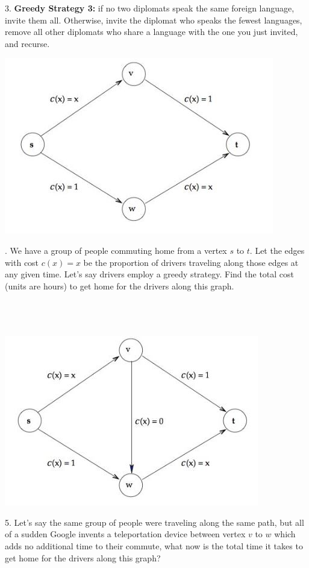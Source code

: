 \documentclass[12pt]{article}
\begin{document}
3. \textbf{Greedy Strategy 3:} if no two diplomats speak the 
same foreign language, invite them all. Otherwise,
invite the diplomat who speaks the fewest languages, 
remove all other diplomats who share a language
with the one you just invited, and recurse.
\newpage
\centerline{\includegraphics[scale = .7]{braess1.jpg}}
. We have a group of people commuting home from a vertex $s$ to $t$.
Let the edges with cost $c(x) = x$ be the proportion
of drivers traveling along those edges at any given time. 
Let's say drivers employ a greedy strategy.
Find the total cost (units are hours) to get home for the drivers along this graph.\\\\\\\\
\centerline{\includegraphics[scale = .7]{braess2.jpg}}
5. Let's say the same group of people were traveling along the same path,
but all of a sudden Google invents a teleportation device between vertex $v$ to $w$ which
adds no additional time to their commute,
what now is the total time it takes to get home for the drivers along this graph?\\\\\\\\
\end{document}
